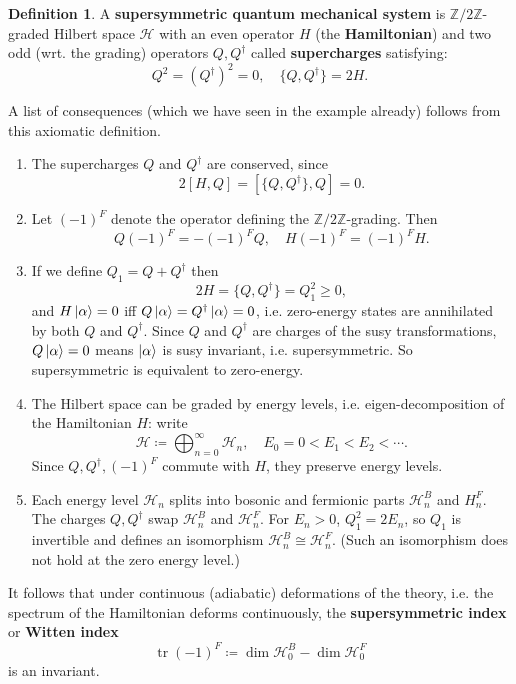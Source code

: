 \documentclass{report}
\theoremstyle{plain}
\theoremstyle{definition}
\newtheorem{definition}[theorem]{Definition}
\theoremstyle{remark}
\newcommand{\bZ}{\mathbb{Z}}
\newcommand{\cH}{\mathcal{H}}
\DeclareMathOperator{\tr}{tr}
\newcommand{\mc}{\mathcal}
\begin{document}
\begin{definition}
  A \textbf{supersymmetric quantum mechanical system} is
  $\bZ/2\bZ$-graded Hilbert space $\mc H$ with an even operator $H$
  (the {\bf Hamiltonian}) and two odd (wrt. the grading) operators
  $Q,Q^\dag$ called {\bf supercharges} satisfying:
  \[ Q^2=(Q^\dagger)^2=0, \quad \{Q,Q^\dag\}=2H. \]
\end{definition}

A list of consequences (which we have seen in the example already)
follows from this axiomatic definition.
\begin{enumerate}
\item The supercharges $Q$ and $Q^\dag$ are conserved, since
  \[ 2[H, Q] = [\{Q, Q^\dag\}, Q] = 0. \]
\item Let $(-1)^F$ denote the operator defining the
  $\bZ/2\bZ$-grading. Then
  \[ Q(-1)^F = -(-1)^FQ, \quad H(-1)^F = (-1)^FH. \]
\item If we define $Q_1=Q+Q^\dagger$ then
  \[ 2H = \{Q, Q^\dag\} = Q_1^2 \ge 0, \]
  and $H\ket{\alpha} = 0$ iff $Q\ket{\alpha} = Q^\dag\ket{\alpha} =
  0$, i.e. zero-energy states are annihilated by both $Q$ and
  $Q^\dag$. Since $Q$ and $Q^\dag$ are charges of the susy
  transformations, $Q\ket{\alpha} = 0$ means $\ket{\alpha}$ is susy
  invariant, i.e. supersymmetric. So supersymmetric is equivalent to
  zero-energy.
\item The Hilbert space can be graded by energy levels, i.e.
  eigen-decomposition of the Hamiltonian $H$: write
  \[ \mc H \coloneqq \bigoplus_{n=0}^\infty \mc H_n, \quad E_0 = 0 < E_1 < E_2 < \cdots. \]
  Since $Q, Q^\dag, (-1)^F$ commute with $H$, they preserve energy
  levels.
\item Each energy level $\mc H_n$ splits into bosonic and fermionic
  parts $\mc H_n^B$ and $H_n^F$. The charges $Q, Q^\dag$ swap $\mc
  H_n^B$ and $\mc H_n^F$. For $E_n > 0$, $Q_1^2 = 2E_n$, so $Q_1$ is
  invertible and defines an isomorphism $\mc H_n^B \cong \mc H_n^F$.
  (Such an isomorphism does not hold at the zero energy level.)
\end{enumerate}
It follows that under continuous (adiabatic) deformations of the
theory, i.e. the spectrum of the Hamiltonian deforms continuously, the
{\bf supersymmetric index} or {\bf Witten index}
\[ \tr (-1)^F \coloneqq \dim \cH_0^B - \dim \cH_0^F \]
is an invariant.
\end{document}
